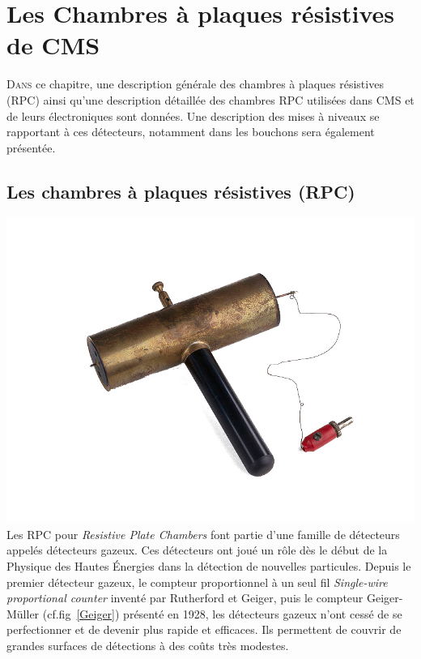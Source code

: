 \chapter{Les Chambres à plaques résistives de CMS}
\renewcommand\chapterillustration{RPC/rpc}
\ThisULCornerWallPaper{1}{\chapterillustration}
\minitoc

\lettrine[lines=4, slope=-0.5em]{D}{ans} ce chapitre, une description générale des chambres à plaques résistives (RPC) ainsi qu'une description détaillée des chambres RPC utilisées dans CMS et de leurs électroniques sont données. Une description des mises à niveaux se rapportant à ces détecteurs, notamment dans les bouchons sera également présentée.

\section{Les chambres à plaques résistives (RPC)}

 \marginpar
{
	\centering
	\includegraphics[width=\marginparwidth]{RPC/Geiger.png}
	\label{Geiger}
}
Les RPC pour \textit{Resistive Plate Chambers} font partie d'une famille de détecteurs appelés détecteurs gazeux. Ces détecteurs ont joué un rôle dès le début de la Physique des Hautes Énergies dans la détection de nouvelles particules. Depuis le premier détecteur gazeux, le compteur proportionnel à un seul fil \textit{Single-wire proportional counter} inventé par Rutherford et Geiger, puis le compteur Geiger-Müller (cf.fig~\ref{Geiger}) présenté en 1928, les détecteurs gazeux n'ont cessé de se perfectionner et de devenir plus rapide et efficaces. Ils permettent de couvrir de grandes surfaces de détections à des coûts très modestes.

